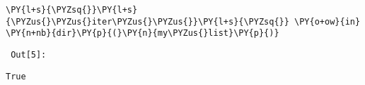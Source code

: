 {\par%
\vspace{-1\baselineskip}%
}%
\begin{notebookcell}[5]%
\begin{addmargin}[\cellleftmargin]{0em}%
{\smaller%
\par%
%
\vspace{-1\smallerfontscale}%
\begin{Verbatim}[commandchars=\\\{\}]
\PY{l+s}{\PYZsq{}}\PY{l+s}{\PYZus{}\PYZus{}iter\PYZus{}\PYZus{}}\PY{l+s}{\PYZsq{}} \PY{o+ow}{in} \PY{n+nb}{dir}\PY{p}{(}\PY{n}{my\PYZus{}list}\PY{p}{)}
\end{Verbatim}
%
\par%
\vspace{-1\smallerfontscale}}%
\end{addmargin}
\end{notebookcell}

\par\vspace{1\smallerfontscale}%
    
        {\par%
        \vspace{-1\smallerfontscale}%
        \noindent%
        \begin{minipage}{\cellleftmargin}%
    \hfill%
    {\smaller%
    \tt%
    \color{nbframe-out-prompt}%
    Out[5]:}%
    \hspace{\inputpadding}%
    \hspace{0em}%
    \hspace{3pt}%
    \end{minipage}%
        }%
    \begin{addmargin}[\cellleftmargin]{0em}%
    {\smaller%
    \vspace{-1\smallerfontscale}%
    
    
    
    \begin{verbatim}
True
    \end{verbatim}

    
}%
    \end{addmargin}%

